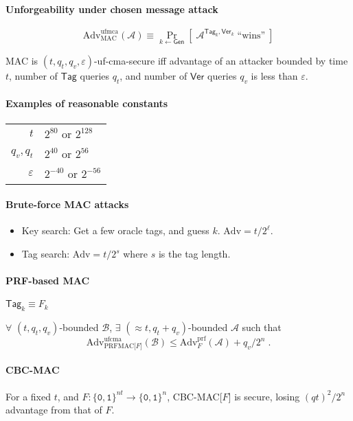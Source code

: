 \documentclass[11pt]{article}
\newcommand{\eqdef}{\ensuremath{\equiv}}
\newcommand{\Gen}{\ensuremath{\mathsf{Gen}}}
\newcommand{\Tag}{\ensuremath{\mathsf{Tag}}}
\newcommand{\Ver}{\ensuremath{\mathsf{Ver}}}
\newcommand{\eps}{\ensuremath{\varepsilon}}
\newcommand{\bit}{\ensuremath{\{\texttt{0},\texttt{1}\}}}
\theoremstyle{remark}
\begin{document}
\paragraph{Unforgeability under chosen message attack}

\[ \text{Adv}_\text{MAC}^\text{ufmca}(\mathcal{A}) \eqdef
\Pr_{k\leftarrow\Gen} \left[\;\mathcal{A}^{\Tag_k,\Ver_k}\;\text{``wins''}\;\right] \]

MAC is $(t, q_t, q_v, \eps)$-uf-cma-secure iff
advantage of an attacker
bounded by time $t$,
number of $\Tag$ queries $q_t$, and
number of $\Ver$ queries $q_v$
is less than $\eps$.

\paragraph{Examples of reasonable constants}
\begin{tabular}{r|l}
$t$ & $2^{80}$ or $2^{128}$ \\
$q_v,q_t$ & $2^{40}$ or $2^{56}$ \\
$\eps$ & $2^{-40}$ or $2^{-56}$
\end{tabular}

\paragraph{Brute-force MAC attacks}

\begin{itemize}
\item Key search:
Get a few oracle tags, and guess $k$.
$\text{Adv} = t/2^\ell$.
\item Tag search:
$\text{Adv} = t/2^s$ where $s$ is the tag length.
\end{itemize}

\paragraph{PRF-based MAC}
$\Tag_k \eqdef F_k$

$\forall$ $(t,q_t,q_v)$-bounded $\mathcal{B}$,
$\exists$ $(\approx t, q_t+q_v)$-bounded $\mathcal{A}$
such that \[ \text{Adv}_\text{PRFMAC[$F$]}^\text{ufcma}(\mathcal{B})
\le \text{Adv}_F^\text{prf}(\mathcal{A}) + q_v/2^n \;\text{.} \]

\paragraph{CBC-MAC}

For a fixed $t$, and $F:\bit^{nt}\rightarrow\bit^n$, CBC-MAC[$F$] is secure,
losing $(qt)^2/2^n$ advantage from that of $F$.
\end{document}
